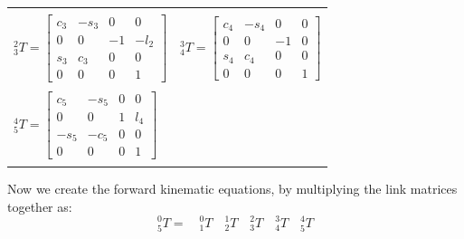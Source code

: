 \begin{Example}
\begin{tabular}{ll}
\\
 & \\
%
%
$
^2_3T=\left[
\begin{array}{cccc}
c_3 &  -s_3 & 0 & 0 \\
0   &   0  & -1 & -l_2 \\
s_3 & c_3 & 0 & 0 \\
0  & 0 & 0 & 1
\end{array}
\right]
$
&
%
%
$
^3_4T=\left[
\begin{array}{cccc}
c_4 &  -s_4 & 0 & 0 \\
0   &   0  & -1 & 0 \\
s_4 & c_4 & 0 & 0 \\
0  & 0 & 0 & 1
\end{array}
\right]
$
\\
 &  \\
%
%
$
^4_5T=\left[
\begin{array}{cccc}
c_5 &  -s_5 & 0 & 0 \\
0   &   0  & 1 &  l_4 \\
-s_5 & -c_5 & 0 & 0 \\
0  & 0 & 0 & 1
\end{array}
\right]
$

& \\
& \\
\end{tabular}

Now we create the   forward kinematic equations,
by multiplying the link matrices together as:	%
\[
^0_5T= \quad ^0_1T \quad ^1_2T \quad ^2_3T \quad ^3_4T \quad ^4_5T
\]

\end{Example}
